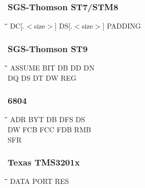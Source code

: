 \subsubsection{SGS-Thomson ST7/STM8}
{\tt\begin{tabbing}
\hspace{3cm}\=\hspace{3cm}\=\hspace{3cm}\=\hspace{3cm}\=\kill
DC[.$<$size$>$] \> DS[.$<$size$>$]   \> PADDING \\
\end{tabbing}}

\subsubsection{SGS-Thomson ST9}
{\tt\begin{tabbing}
\hspace{3cm}\=\hspace{3cm}\=\hspace{3cm}\=\hspace{3cm}\=\kill
ASSUME     \> BIT         \> DB          \> DD          \> DN \\
DQ         \> DS          \> DT          \> DW          \> REG \\
\end{tabbing}}

\subsubsection{6804}
{\tt\begin{tabbing}
\hspace{3cm}\=\hspace{3cm}\=\hspace{3cm}\=\hspace{3cm}\=\kill
ADR        \> BYT         \> DB          \> DFS         \> DS \\
DW         \> FCB         \> FCC         \> FDB         \> RMB \\
SFR \\
\end{tabbing}}

\subsubsection{Texas TMS3201x}
{\tt\begin{tabbing}
\hspace{3cm}\=\hspace{3cm}\=\hspace{3cm}\=\hspace{3cm}\=\kill
DATA       \> PORT        \> RES \\
\end{tabbing}}


